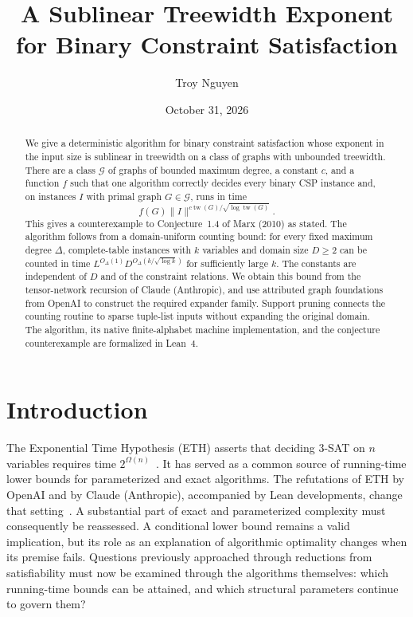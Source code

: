 \documentclass[11pt,reqno]{amsart}
\title[A sublinear treewidth exponent for binary CSP]{A Sublinear Treewidth Exponent\\for Binary Constraint Satisfaction}
\author{Troy Nguyen}
\date{October 31, 2026}
\numberwithin{equation}{section}
\theoremstyle{definition}
\theoremstyle{remark}
\newcommand{\tw}{\operatorname{tw}}
\begin{document}
\begin{abstract}
We give a deterministic algorithm for binary constraint satisfaction whose exponent in the input size is sublinear in treewidth on a class of graphs with unbounded treewidth. There are a class $\mathcal G$ of graphs of bounded maximum degree, a constant $c$, and a function $f$ such that one algorithm correctly decides every binary CSP instance and, on instances $I$ with primal graph $G\in\mathcal G$, runs in time
\[
 f(G)\lVert I\rVert^{c\tw(G)/\sqrt{\log\tw(G)}}.
\]
This gives a counterexample to Conjecture~1.4 of Marx (2010) as stated. The algorithm follows from a domain-uniform counting bound: for every fixed maximum degree $\Delta$, complete-table instances with $k$ variables and domain size $D\ge2$ can be counted in time $L^{O_\Delta(1)}D^{O_\Delta(k/\sqrt{\log k})}$ for sufficiently large $k$. The constants are independent of $D$ and of the constraint relations. We obtain this bound from the tensor-network recursion of Claude (Anthropic), and use attributed graph foundations from OpenAI to construct the required expander family. Support pruning connects the counting routine to sparse tuple-list inputs without expanding the original domain. The algorithm, its native finite-alphabet machine implementation, and the conjecture counterexample are formalized in Lean~4.
\end{abstract}
\maketitle
\setcounter{tocdepth}{1}
\tableofcontents

\section{Introduction}

The Exponential Time Hypothesis (ETH) asserts that deciding $3$-SAT on $n$ variables requires time $2^{\Omega(n)}$~\cite{IP01}. It has served as a common source of running-time lower bounds for parameterized and exact algorithms. The refutations of ETH by OpenAI and by Claude (Anthropic), accompanied by Lean developments, change that setting~\cite{OpenAIETH,OpenAILean,ClaudeETH,AnthropicLean}. A substantial part of exact and parameterized complexity must consequently be reassessed. A conditional lower bound remains a valid implication, but its role as an explanation of algorithmic optimality changes when its premise fails. Questions previously approached through reductions from satisfiability must now be examined through the algorithms themselves: which running-time bounds can be attained, and which structural parameters continue to govern them?
\end{document}
